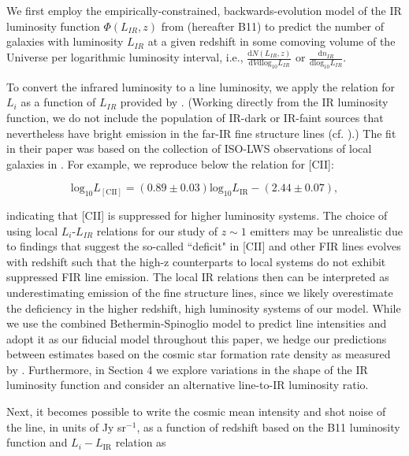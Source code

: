 \documentclass[iop,twocolappendix]{emulateapj}
\begin{document}
We first employ the empirically-constrained, backwards-evolution model of the IR luminosity function $\Phi(L_{IR}, z)$ from \citet{bethermin11} (hereafter B11) to predict the number of galaxies with luminosity $L_{IR}$ at a given redshift in some comoving volume of the Universe per logarithmic luminosity interval, i.e., $\frac{\mathrm{d}N(L_{IR},z)}{\mathrm{d}V\mathrm{dlog_{10}}L_{IR}}$ or $\frac{\mathrm{d}n_{IR}}{\mathrm{dlog_{10}}L_{IR}}$. 

To convert the infrared luminosity to a line luminosity, we apply the relation for $L_{i}$ as a function of $L_{IR}$ provided by \citet{spinoglio12}. (Working directly from the IR luminosity function, we do not include the population of IR-dark or IR-faint sources that nevertheless have bright emission in the far-IR fine structure lines (cf. \citet{Riechers14}).) The fit in their paper was based on the collection of ISO-LWS observations of local galaxies in \citet{brauher08}. For example, we reproduce below the relation for [CII]:

\begin{equation}
\mathrm{log_{10}}L_{\mathrm{[CII]}} = (0.89 \pm 0.03) \mathrm{log_{10}}L_{\mathrm{IR}} - (2.44 \pm 0.07),
\end{equation}

indicating that [CII] is suppressed for higher luminosity systems. The choice of using local $L_i$-$L_{IR}$ relations for our study of $z\sim1$ emitters may be unrealistic due to findings that suggest the so-called ``deficit" in [CII] and other FIR lines evolves with redshift such that the high-z counterparts to local systems do not exhibit suppressed FIR line emission. The local IR relations then can be interpreted as underestimating emission of the fine structure lines, since we likely overestimate the deficiency in the higher redshift, high luminosity systems of our model. While we use the combined Bethermin-Spinoglio model to predict line intensities and adopt it as our fiducial model throughout this paper, we hedge our predictions between estimates based on the cosmic star formation rate density as measured by \citet{hb06}. Furthermore, in Section 4 we explore variations in the shape of the IR luminosity function and consider an alternative line-to-IR luminosity ratio.

Next, it becomes possible to write the cosmic mean intensity and shot noise of the line, in units of Jy sr$^{-1}$,  as a function of redshift based on the B11 luminosity function and \citet{spinoglio12} $L_{i}-L_{\mathrm{IR}}$ relation as
\end{document}
